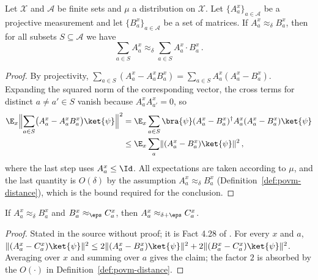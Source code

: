 \begin{lemma}\label{lem:cool-closeness-fact}
	\leanok
	Let $\mathcal X$ and $\mathcal A$ be finite sets and $\mu$ a distribution on $\mathcal X$. Let $\{A^x_a\}_{a \in \mathcal A}$ be a projective measurement and let $\{B^x_a\}_{a \in \mathcal A}$ be a set of matrices. If $A^x_a \approx_\delta B^x_a$, then for all subsets $S \subseteq \mathcal A$ we have
	\[
		\sum_{a \in S} A^x_a \approx_\delta \sum_{a \in S} A^x_a \cdot B^x_a\,.
	\]
\end{lemma}
\begin{proof}
	\leanok
	By projectivity, $\sum_{a \in S} (A^x_a - A^x_a B^x_a) = \sum_{a \in S} A^x_a (A^x_a - B^x_a)$. Expanding the squared norm of the corresponding vector, the cross terms for distinct $a \ne a' \in S$ vanish because $A^x_a A^x_{a'} = 0$, so
	\begin{align*}
		\E_x \Bigl\lVert \sum_{a \in S} \bigl(A^x_a - A^x_a B^x_a\bigr) \ket{\psi} \Bigr\rVert^2
		&= \E_x \sum_{a \in S} \bra{\psi} (A^x_a - B^x_a)^\dagger A^x_a (A^x_a - B^x_a) \ket{\psi}\\
		&\le \E_x \sum_a \lVert (A^x_a - B^x_a)\ket{\psi} \rVert^2\,,
	\end{align*}
	where the last step uses $A^x_a \le \Id$. All expectations are taken according to $\mu$, and the last quantity is $O(\delta)$ by the assumption $A^x_a \approx_\delta B^x_a$ (Definition~\ref{def:povm-distance}), which is the bound required for the conclusion.
\end{proof}

\begin{lemma}\label{fact:triangle}
	\leanok
	If $A^x_a \approx_\delta B^x_a$ and $B^x_a \approx_{\eps} C^x_a$, then $A^x_a \approx_{\delta+\eps} C^x_a$.
\end{lemma}
\begin{proof}
	\leanok
	Stated in the source without proof; it is Fact 4.28 of \cite{Natarajan2018NEEXP}. For every $x$ and $a$, $\lVert (A^x_a - C^x_a)\ket{\psi} \rVert^2 \le 2\lVert (A^x_a - B^x_a)\ket{\psi} \rVert^2 + 2\lVert (B^x_a - C^x_a)\ket{\psi} \rVert^2$. Averaging over $x$ and summing over $a$ gives the claim; the factor $2$ is absorbed by the $O(\cdot)$ in Definition~\ref{def:povm-distance}.
\end{proof}

